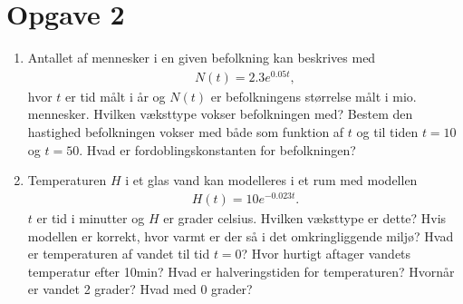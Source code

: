 \section*{Opgave 2}
\begin{enumerate}[label=\roman*)]
\item
Antallet af mennesker i en given befolkning kan beskrives med
\begin{align*}
N(t) = 2.3e^{0.05t},
\end{align*}
hvor $t$ er tid målt i år og $N(t)$ er befolkningens størrelse målt i mio. mennesker. Hvilken væksttype vokser befolkningen med? Bestem den hastighed befolkningen vokser med både som funktion af $t$ og til tiden $t = 10$ og $t=50$. Hvad er fordoblingskonstanten for befolkningen?
\item Temperaturen $H$ i et glas vand kan modelleres i et rum med modellen
\begin{align*}
H(t) = 10e^{-0.023t}.
\end{align*}
$t$ er tid i minutter og $H$ er grader celsius. Hvilken væksttype er dette? Hvis modellen er korrekt, hvor varmt er der så i det omkringliggende miljø? Hvad er temperaturen af vandet til tid $t=0$? Hvor hurtigt aftager vandets temperatur efter 10min? Hvad er halveringstiden for temperaturen? Hvornår er vandet 2 grader? Hvad med 0 grader?
\end{enumerate}
